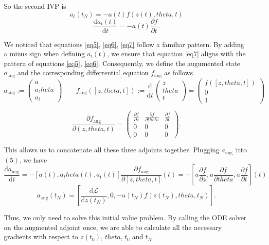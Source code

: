 \documentclass[a4paper,11pt,titlepage]{article}
\def\theta{theta}%
\theoremstyle{definition}
\theoremstyle{plain}
\theoremstyle{remark}
\begin{document}
So the second IVP is 
$$a_t(t_N)=-a(t)f(z(t),\theta,t)$$
\begin{equation}\label{eq7}
    \frac{\mathrm{d}a_t(t)}{\mathrm{d}t} = -a(t)\frac{\partial f}{\partial t}.\tag{7}
\end{equation}

We noticed that equations \ref{eq5}, \ref{eq6}, \ref{eq7} follow a familiar pattern. By adding a minus sign when defining $a_t(t)$, we ensure that equation \ref{eq7} aligns with the pattern of equations \ref{eq5}, \ref{eq6}. Consequently, we define the augumented state $a_{\mathrm{aug}}$ and the corresponding differrential equation $f_{\mathrm{aug}}$ as follows
$$a_{\mathrm{aug}}:= \begin{pmatrix}a\\ a_\theta\\ a_t\end{pmatrix}\quad\quad f_{\mathrm{aug}}([z,\theta,t]):=\frac{\mathrm{d}}{\mathrm{d}t}\begin{pmatrix}z\\\theta\\ t\end{pmatrix}=\begin{pmatrix}f([z,\theta,t])\\0\\1\end{pmatrix}$$

\[
\frac{\partial f_{\mathrm{aug}}}{\partial (z, \theta, t)} = 
\begin{pmatrix}
\frac{\partial f}{\partial z} & \frac{\partial f}{\partial \theta} & \frac{\partial f}{\partial t} \\
0 & 0 & 0 \\
0 & 0 & 0 
\end{pmatrix}.
\]

This allows us to concatenate all these three adjoints together. Plugging $a_{\mathrm{aug}}$ into $(5)$, we have
$$
\frac{\mathrm{d}a_{\mathrm{aug}}}{\mathrm{d}t} = -[a(t), a_\theta(t), a_t(t)]\frac{\partial f_{\mathrm{aug}}}{\partial [z,\theta,t]}(t)=-\left[a\frac{\partial f}{\partial z},a\frac{\partial f}{\partial \theta},a\frac{\partial f}{\partial t}\right](t)
$$
$$
a_{\mathrm{aug}}(t_N)=\left[\frac{\mathrm{d}\mathcal{L}}{\mathrm{d}z(t_N)},0,-a(t_N)f(z(t_N),\theta, t_N)\right].
$$

Thus, we only need to solve this initial value problem. By calling the ODE solver on the augmented adjoint once, we are able to calculate all the necessary gradients with respect to $z(t_0)$, $\theta$, $t_0$ and $t_N$.
\end{document}
